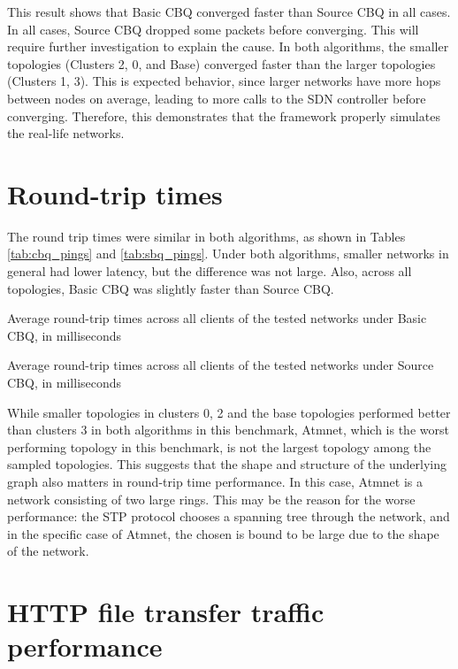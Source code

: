 This result shows that Basic CBQ converged faster than Source CBQ in all cases. In all cases, Source CBQ dropped some packets before converging. This will require further investigation to explain the cause. In both algorithms, the smaller topologies (Clusters 2, 0, and Base) converged faster than the larger topologies (Clusters 1, 3). This is expected behavior, since larger networks have more hops between nodes on average, leading to more calls to the SDN controller before converging. Therefore, this demonstrates that the framework properly simulates the real-life networks.

\section{Round-trip times}
The round trip times were similar in both algorithms, as shown in Tables \ref{tab:cbq_pings} and \ref{tab:sbq_pings}. Under both algorithms, smaller networks in general had lower latency, but the difference was not large. Also, across all topologies, Basic CBQ was slightly faster than Source CBQ.

\begin{table}[htbp]
    \caption{Average round-trip times across all clients of the tested networks under Basic CBQ, in milliseconds}
    \centering
    
    \label{tab:cbq_pings}
\end{table}

\begin{table}[htbp]
    \caption{Average round-trip times across all clients of the tested networks under Source CBQ, in milliseconds}
    \centering
    
    \label{tab:sbq_pings}
\end{table}

While smaller topologies in clusters 0, 2 and the base topologies performed better than clusters 3 in both algorithms in this benchmark, Atmnet, which is the worst performing topology in this benchmark, is not the largest topology among the sampled topologies. This suggests that the shape and structure of the underlying graph also matters in round-trip time performance. In this case, Atmnet is a network consisting of two large rings. This may be the reason for the worse performance: the STP protocol chooses a spanning tree through the network, and in the specific case of Atmnet, the chosen is bound to be large due to the shape of the network.

\section{HTTP file transfer traffic performance}


